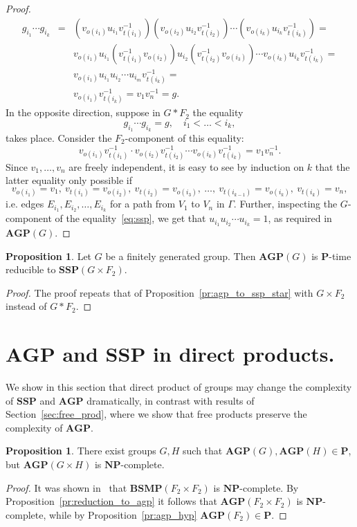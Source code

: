 \documentclass[10pt]{amsart}
\theoremstyle{definition}
\newtheorem{proposition}[theorem]{Proposition}
\def\P{{\mathbf{P}}}
\def\NP{{\mathbf{NP}}}
\def\SSP{{\mathbf{SSP}}}
\def\BSMP{{\mathbf{BSMP}}}
\def\AGP{{\mathbf{AGP}}}
\begin{document}
\begin{proof}
\begin{eqnarray*}
g_{i_1}\cdots g_{i_k}&=&(v_{o(i_1)}u_{i_1}v_{t(i_1)}^{-1})
(v_{o(i_2)}u_{i_2}v_{t(i_2)}^{-1})\cdots (v_{o(i_k)}u_{i_k}v_{t(i_k)}^{-1})=\\
&&v_{o(i_1)}u_{i_1}(v_{t(i_1)}^{-1}
v_{o(i_2)})u_{i_2}(v_{t(i_2)}^{-1}v_{o(i_3)})\cdots v_{o(i_k)}u_{i_k}v_{t(i_k)}^{-1}=\\
&&v_{o(i_1)}u_{i_1}u_{i_2}\cdots u_{i_m}v_{t(i_k)}^{-1}=\\
&&v_{o(i_1)}v_{t(i_k)}^{-1}=v_{1}v_{n}^{-1}=g.
\end{eqnarray*}
In the opposite direction, suppose in $G\ast F_2$ the equality
\begin{equation}\label{eq:ssp}
g_{i_1}\cdots g_{i_k}=g,\quad i_1<\ldots<i_k,
\end{equation}
takes place. Consider the $F_2$-component of this equality:
$$
v_{o(i_1)}v_{t(i_1)}^{-1}\cdot v_{o(i_2)}v_{t(i_2)}^{-1}\cdots v_{o(i_k)}v_{t(i_k)}^{-1}=v_1v_n^{-1}.
$$
Since $v_1,\ldots, v_n$ are freely independent, it is easy to see by induction on $k$ that the latter equality only possible if
$$
v_{o(i_1)}=v_1,\ v_{t(i_1)}=v_{o(i_2)},\ v_{t(i_2)}=v_{o(i_3)},\ \ldots,\ v_{t(i_{k-1})}=v_{o(i_k)},\ v_{t(i_k)}=v_n,
$$
i.e. edges $E_{i_1}, E_{i_2},\ldots, E_{i_k}$ for a path from $V_1$ to $V_n$ in $\Gamma$. Further, inspecting the $G$-component of the equality~\eqref{eq:ssp}, we get that $u_{i_1}u_{i_2}\cdots u_{i_k}=1$, as required in $\AGP(G)$.
\end{proof}

\begin{proposition}\label{pr:agp_to_ssp_cross}
Let $G$ be a finitely generated group. Then $\AGP(G)$ is $\P$-time reducible to $\SSP(G\times F_2)$.
\end{proposition}
\begin{proof}
The proof repeats that of Proposition~\ref{pr:agp_to_ssp_star} with $G\times F_2$ instead of $G\ast F_2$.
\end{proof}

\section{$\AGP$ and $\SSP$ in direct products.}\label{sec:direct_prod}
We show in this section that direct product of groups may change the complexity of $\SSP$ and $\AGP$ dramatically, in contrast with results of Section~\ref{sec:free_prod}, where we show that free products preserve the complexity of $\AGP$.
\begin{proposition}\label{pr:agp_cross}
There exist groups $G,H$ such that $\AGP(G),\AGP(H)\in\P$, but $\AGP(G\times H)$ is $\NP$-complete.
\end{proposition}
\begin{proof}
It was shown in~\cite[Theorem 7.4]{Miasnikov-Nikolaev-Ushakov:2014a} that $\BSMP(F_2\times F_2)$ is $\NP$-complete. By Proposition~\ref{pr:reduction_to_agp} it follows that $\AGP(F_2\times F_2)$ is $\NP$-complete, while by Proposition~\ref{pr:agp_hyp} $\AGP(F_2)\in\P$.
\end{proof}
\end{document}
